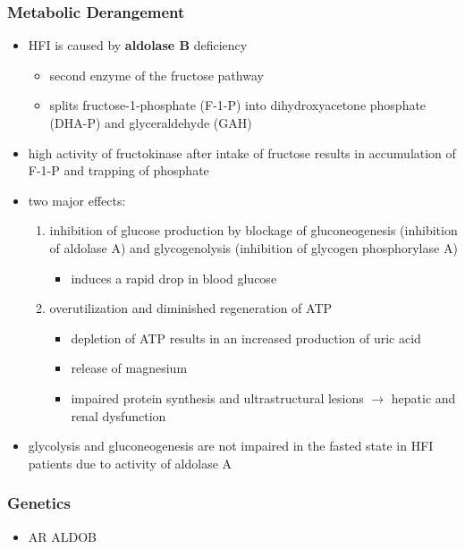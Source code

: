 \documentclass{scrartcl}
\begin{document}
\subsubsection{Metabolic Derangement}
\label{sec:org73ce116}
\begin{itemize}
\item HFI is caused by \textbf{aldolase B} deficiency
\begin{itemize}
\item second enzyme of the fructose pathway
\item splits fructose-1-phosphate (F-1-P) into dihydroxyacetone phosphate (DHA-P) and glyceraldehyde (GAH)
\end{itemize}
\item high activity of fructokinase after intake of fructose results in
accumulation of F-1-P and trapping of phosphate
\item two major effects:
\begin{enumerate}
\item inhibition of glucose production by blockage of gluconeogenesis
(inhibition of aldolase A) and glycogenolysis (inhibition of glycogen phosphorylase A)
\begin{itemize}
\item induces a rapid drop in blood glucose
\end{itemize}
\item overutilization and diminished regeneration of ATP
\begin{itemize}
\item depletion of ATP results in an increased production of uric acid
\item release of magnesium
\item impaired protein synthesis and ultrastructural lesions \(\to\)
hepatic and renal dysfunction
\end{itemize}
\end{enumerate}
\item glycolysis and gluconeogenesis are not impaired in the fasted state
in HFI patients due to activity of aldolase A
\end{itemize}

\subsubsection{Genetics}
\label{sec:orga3827d9}
\begin{itemize}
\item AR ALDOB
\end{itemize}
\end{document}
